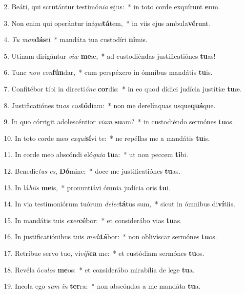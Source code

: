 2. Beáti, qui scrutántur testimó\textit{ni}\textit{a} \textbf{e}jus:~*  in toto corde exquírunt \textbf{e}um.\

3. Non enim qui operántur in\textit{i}\textit{qui}\textbf{tá}tem,~*  in viis ejus ambula\textbf{vé}runt.\

4. \textit{Tu} \textit{man}\textbf{dás}ti~*  mandáta tua custodíri \textbf{ni}mis.\

5. Utinam dirigántur \textit{vi}\textit{æ} \textbf{me}æ,~*  ad custodiéndas justificatiónes \textbf{tu}as!\

6. Tunc \textit{non} \textit{con}\textbf{fún}dar,~*  cum perspéxero in ómnibus mandátis \textbf{tu}is.\

7. Confitébor tibi in directi\textit{ó}\textit{ne} \textbf{cor}dis:~*  in eo quod dídici judícia justítiæ \textbf{tu}æ.\

8. Justificatiónes tu\textit{as} \textit{cus}\textbf{tó}diam:~*  non me derelínquas usque\textbf{quá}que.\

9. In quo córrigit adolescéntior \textit{vi}\textit{am} \textbf{su}am?~*  in custodiéndo sermónes \textbf{tu}os.\

10. In toto corde meo \textit{ex}\textit{qui}\textbf{sí}vi te:~*  ne repéllas me a mandátis \textbf{tu}is.\

11. In corde meo abscóndi eló\textit{qui}\textit{a} \textbf{tu}a:~*  ut non peccem \textbf{ti}bi.\

12. Benedíc\textit{tus} \textit{es}, \textbf{Dó}mine:~*  doce me justificatiónes \textbf{tu}as.\

13. In lá\textit{bi}\textit{is} \textbf{me}is,~*  pronuntiávi ómnia judícia oris \textbf{tu}i.\

14. In via testimoniórum tuórum \textit{de}\textit{lec}\textbf{tá}tus sum,~*  sicut in ómnibus di\textbf{ví}tiis.\

15. In mandátis tuis \textit{ex}\textit{er}\textbf{cé}bor:~*  et considerábo vias \textbf{tu}as.\

16. In justificatiónibus tuis \textit{me}\textit{di}\textbf{tá}bor:~*  non oblivíscar sermónes \textbf{tu}os.\

17. Retríbue servo tuo, vi\textit{ví}\textit{fi}\textbf{ca} me:~*  et custódiam sermónes \textbf{tu}os.\

18. Revéla ó\textit{cu}\textit{los} \textbf{me}os:~*  et considerábo mirabília de lege \textbf{tu}a.\

19. Incola ego \textit{sum} \textit{in} \textbf{ter}ra:~*  non abscóndas a me mandáta \textbf{tu}a.\

